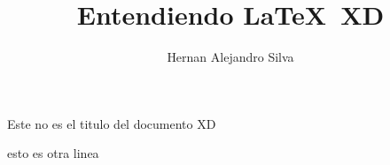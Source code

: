 \documentclass[a4paper,11pt]{article}
\author{Hernan Alejandro Silva}
\title{Entendiendo \LaTeX\  XD}
\begin{document}
    Este no es el titulo del documento XD\par esto es otra linea
\end{document}
